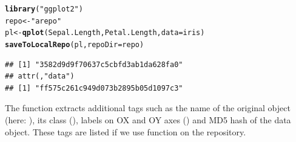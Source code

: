 \documentclass[nojss]{jss}\usepackage[]{graphicx}\usepackage[]{color}
\makeatletter
\newcommand{\hlstr}[1]{\textcolor[rgb]{0.192,0.494,0.8}{#1}}%
\newcommand{\hlstd}[1]{\textcolor[rgb]{0.345,0.345,0.345}{#1}}%
\newcommand{\hlkwb}[1]{\textcolor[rgb]{0.69,0.353,0.396}{#1}}%
\newcommand{\hlkwc}[1]{\textcolor[rgb]{0.333,0.667,0.333}{#1}}%
\newcommand{\hlkwd}[1]{\textcolor[rgb]{0.737,0.353,0.396}{\textbf{#1}}}%
\newenvironment{kframe}{%
 \def\at@end@of@kframe{}%
 \ifinner\ifhmode%
  \def\at@end@of@kframe{\end{minipage}}%
  \begin{minipage}{\columnwidth}%
 \fi\fi%
 \def\FrameCommand##1{\hskip\@totalleftmargin \hskip-\fboxsep
 \colorbox{shadecolor}{##1}\hskip-\fboxsep
     \hskip-\linewidth \hskip-\@totalleftmargin \hskip\columnwidth}%
 \MakeFramed {\advance\hsize-\width
   \@totalleftmargin\z@ \linewidth\hsize
   \@setminipage}}%
 {\par\unskip\endMakeFramed%
 \at@end@of@kframe}
\newenvironment{knitrout}{}{} %
\makeatother
\begin{document}
\begin{knitrout}
\color{fgcolor}\begin{kframe}
\begin{alltt}
\hlkwd{library}\hlstd{(}\hlstr{"ggplot2"}\hlstd{)}
\hlstd{repo} \hlkwb{<-} \hlstr{"arepo"}
\hlstd{pl} \hlkwb{<-} \hlkwd{qplot}\hlstd{(Sepal.Length, Petal.Length,} \hlkwc{data} \hlstd{= iris)}
\hlkwd{saveToLocalRepo}\hlstd{(pl,} \hlkwc{repoDir} \hlstd{= repo)}
\end{alltt}
\begin{verbatim}
## [1] "3582d9d9f70637c5cbfd3ab1da628fa0"
## attr(,"data")
## [1] "ff575c261c949d073b2895b05d1097c3"
\end{verbatim}
\end{kframe}
\end{knitrout}


The function  extracts additional tags such as the name of the original object (here: ), its class (), labels on OX and OY axes () and MD5 hash of the data object. These tags are listed if we use  function on the repository.
\end{document}
